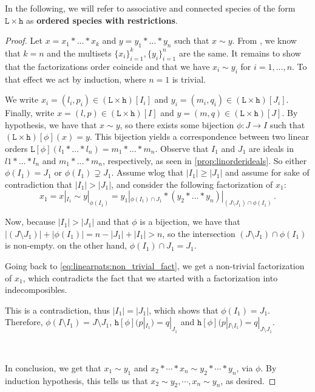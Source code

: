 \documentclass[12pt, reqno]{amsart}
\theoremstyle{definition}
\begin{document}
In the following, we will refer to associative and connected species of the form $\mathtt{L} \times \mathtt{h}$ as \textbf{ordered species with restrictions}.

\begin{proof}
Let $x = x_1 \ast \dots \ast x_k $ and $ y =  y_1 \ast \dots \ast y_n$ such that $x \sim y$.
From \cite[Corollary 3.4.]{Penaguiao2020}, we know that $k = n$ and the multisets $\{x_i\}_{i=1}^k,  \{y_i\}_{i=1}^n$ are the same.
It remains to show that the factorizations order coincide and that we have $x_i \sim y_i$ for $i = 1, \dots , n$.
To that effect we act by induction, where $n = 1$ is trivial.


We write $x_i = (l_i, p_i)\in (\mathtt{L}\times \mathtt{h})[I_i]$ and $y_i = (m_i, q_i)\in (\mathtt{L}\times \mathtt{h})[J_i]$.
Finally, write $x = (l, p) \in (\mathtt{L}\times \mathtt{h})[I] $ and $y = (m, q) \in (\mathtt{L}\times \mathtt{h})[J]$.
By hypothesis, we have that $x \sim y$, so there exists some bijection $\phi: J \to I$ such that $ (\mathtt{L}\times \mathtt{h})[\phi](x) = y$.
This bijection yields a correspondence between two linear orders $\mathtt{L} [\phi] (l_1 \ast \dots \ast l_n) = m_1\ast \dots \ast m_n $.
Observe that $I_1$ and $J_1$ are ideals in $l1\ast \dots \ast l_n$ and $m_1 \ast \dots \ast m_n$, respectively, as seen in \cref{prop:linorderideals}.
So either $\phi (I_1)= J_1 $ or $\phi (I_1)\supsetneq J_1 $.
Assume wlog that $|I_1 | \geq	 |J_1|$ and assume for sake of contradiction that $|I_1| > |J_1|$, and consider the following factorization of $x_1 $:
\begin{equation}\label{eq:linearpats:non_trivial_fact}
x_1 = x|_{I_1} \sim y|_{\phi(I_1)} = y_1|_{\phi(I_1) \cap J_1} \ast (y_2 \ast \dots \ast y_n)|_{(J\setminus J_1) \cap \phi(I_1)}\, . 
\end{equation}

Now, because $|I_1| > |J_1|$ and that $\phi $ is a bijection, we have that $| (J\setminus J_1) | + | \phi(I_1) | = n - |J_1| + |I_1| > n$, so the intersection $(J\setminus J_1) \cap \phi(I_1)$ is non-empty.
on the other hand, $\phi(I_1) \cap J_1 = J_1$.

Going back to \eqref{eq:linearpats:non_trivial_fact}, we get a non-trivial factorization of $x_1$, which contradicts the fact that we started with a factorization into indecomposibles.

This is a contradiction, thus $|I_1 | = |J_1|$, which shows that $\phi(I_1) = J_1$.
Therefore,  $\phi(I\setminus I_1) = J \setminus  J_1$, $ \mathtt{h}[\phi] (p|_{I_1}) = q|_{J_1} $ and $ \mathtt{h}[\phi] (p|_{I \setminus I_1}) = q|_{J \setminus J_1} $.

\

In conclusion, we get that $x_1 \sim y_1$ and $x_2 \ast \cdots \ast x_n \sim y_2 \ast \cdots \ast y_n$, via $\phi$.
By induction hypothesis, this tells us that $x_2 \sim y_2, \cdots , x_n \sim y_n$, as desired.
\end{proof}
\end{document}
